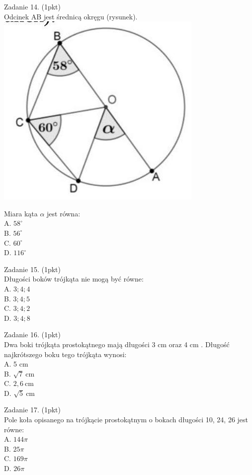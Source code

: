 \documentclass[10pt]{article}
\begin{document}
Zadanie 14. (1pkt)\\
Odcinek AB jest średnicą okręgu (rysunek).\\
\includegraphics[max width=\textwidth, center]{2024_11_21_0fa17f80dfe1c6bd3b66g-04}

Miara kąta \(\alpha\) jest równa:\\
A. \(58^{\circ}\)\\
B. \(56^{\circ}\)\\
C. \(60^{\circ}\)\\
D. \(116^{\circ}\)

Zadanie 15. (1pkt)\\
Długości boków trójkąta nie mogą być równe:\\
A. \(3 ; 4 ; 4\)\\
B. \(3 ; 4 ; 5\)\\
C. \(3 ; 4 ; 2\)\\
D. \(3 ; 4 ; 8\)

Zadanie 16. (1pkt)\\
Dwa boki trójkąta prostokątnego mają długości 3 cm oraz 4 cm . Długość najkrótszego boku tego trójkąta wynosi:\\
A. 5 cm\\
B. \(\sqrt{7} \mathrm{~cm}\)\\
C. \(2,6 \mathrm{~cm}\)\\
D. \(\sqrt{5} \mathrm{~cm}\)

Zadanie 17. (1pkt)\\
Pole koła opisanego na trójkącie prostokątnym o bokach długości 10, 24, 26 jest równe:\\
A. \(144 \pi\)\\
B. \(25 \pi\)\\
C. \(169 \pi\)\\
D. \(26 \pi\)
\end{document}
